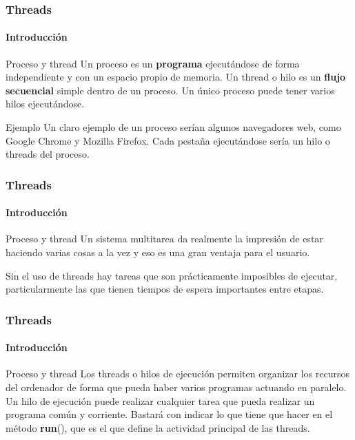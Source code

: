 \documentclass{beamer}
\begin{document}
	\begin{frame}
		\frametitle{Threads}
		\framesubtitle{Introducci\'on}

		\begin{alertblock}{Proceso y thread}
			Un proceso es un \textbf{programa} ejecut\'andose de forma independiente y con un espacio propio de memoria. Un thread o hilo es un \textbf{flujo secuencial} simple dentro de un proceso. Un \'unico proceso puede tener varios hilos ejecut\'andose.
        \end{alertblock}
        \begin{exampleblock}{Ejemplo}
			Un claro ejemplo de un proceso ser\'ian algunos navegadores web, como Google Chrome y Mozilla Firefox. Cada pesta\~na ejecut\'andose ser\'ia un hilo o threads del proceso.
        \end{exampleblock}
	\end{frame} 

    \begin{frame}
		\frametitle{Threads}
		\framesubtitle{Introducci\'on}

		\begin{alertblock}{Proceso y thread}
			Un sistema multitarea da realmente la impresi\'on de estar haciendo varias cosas a la vez y eso es una gran ventaja para el usuario.
        \end{alertblock}
		\begin{alertblock}{}        
			Sin el uso de threads hay tareas que son pr\'acticamente imposibles de ejecutar, particularmente las que tienen tiempos de espera importantes entre etapas.
        \end{alertblock}
	\end{frame} 

    \begin{frame}
		\frametitle{Threads}
		\framesubtitle{Introducci\'on}

		\begin{alertblock}{Proceso y thread}
			Los threads o hilos de ejecuci\'on permiten organizar los recursos del ordenador de forma que pueda haber varios programas actuando en paralelo. Un hilo de ejecuci\'on puede realizar cualquier tarea que pueda realizar un programa com\'un y corriente. Bastar\'a con indicar lo que tiene que hacer en el m\'etodo \textbf{run}(), que es el que define la actividad principal de las threads.
        \end{alertblock}
	\end{frame} 
\end{document}
